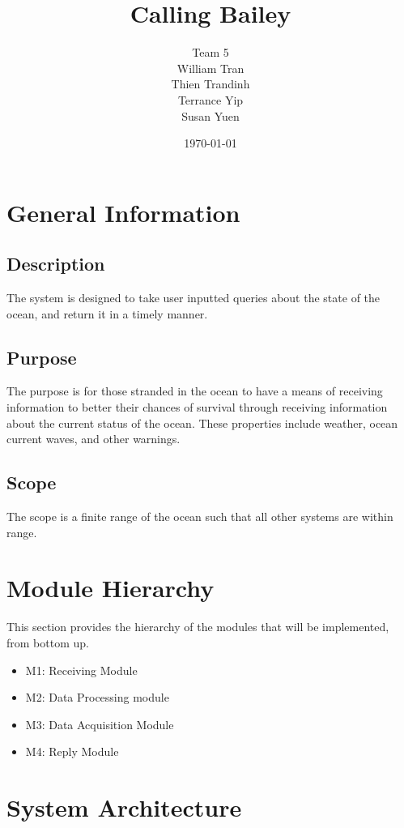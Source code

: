 \documentclass{article}
\title{Calling Bailey}
\author{ Team 5 \\ 
        William Tran \\
		Thien Trandinh \\
		Terrance Yip \\
		Susan Yuen}
\date{\today}
\begin{document}
\maketitle
\newpage
\tableofcontents
\listoffigures

\newpage

\section {General Information}

\subsection{Description}

The system is designed to take user inputted queries about the state of the ocean, and return it in a timely manner.

\subsection{Purpose}

The purpose is for those stranded in the ocean to have a means of receiving information to better their chances of survival through receiving information about the current status of the ocean. These properties include weather, ocean current waves, and other warnings.

\subsection{Scope}

The scope is a finite range of the ocean such that all other systems are within range.

\section{Module Hierarchy}
This section provides the hierarchy of the modules that will be implemented, from bottom up.

\begin{itemize}
    \item M1: Receiving Module
    \item M2: Data Processing module
    \item M3: Data Acquisition Module
    \item M4: Reply Module
\end{itemize}

\section{System Architecture}
\end{document}
